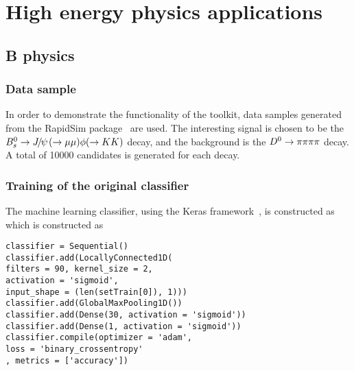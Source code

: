\section{High energy physics applications}
\label{sec:hep}

\subsection{B physics}

\subsubsection{Data sample}

In order to demonstrate the functionality of the toolkit, data samples generated
from the RapidSim package~\cite{rapid} are used. The interesting signal is chosen
to be the ${{B}^0_{s}}\rightarrow{\ensuremath{{J\mskip -3mu/\mskip -2mu\psi\mskip 2mu}}}(\rightarrow\mu\mu )\phi (\rightarrow KK )$ decay, and the background is
the ${{D}^0}\rightarrow\pi\pi\pi\pi$ decay. A total of 10000 candidates is generated for each decay.

\subsubsection{Training of the original classifier}
\label{sec:orig_training}

The machine learning classifier, using the Keras framework~\cite{keras}, 
is constructed as
which is constructed as
\begin{lstlisting}
classifier = Sequential()
classifier.add(LocallyConnected1D(
filters = 90, kernel_size = 2,
activation = 'sigmoid',
input_shape = (len(setTrain[0]), 1)))
classifier.add(GlobalMaxPooling1D())
classifier.add(Dense(30, activation = 'sigmoid'))
classifier.add(Dense(1, activation = 'sigmoid'))
classifier.compile(optimizer = 'adam',
loss = 'binary_crossentropy'
, metrics = ['accuracy'])
\end{lstlisting}

